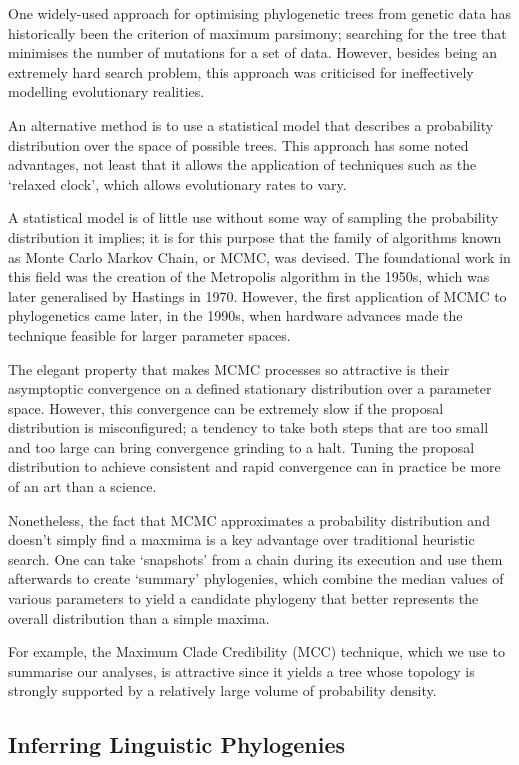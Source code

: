 \documentclass[10pt,journal,compsoc]{IEEEtran}
\begin{document}
One widely-used approach for optimising phylogenetic trees from genetic data has historically been the criterion of maximum parsimony; searching for the tree that minimises the number of mutations for a set of data. However, besides being an extremely hard search problem, this approach was criticised for ineffectively modelling evolutionary realities.

An alternative method is to use a statistical model that describes a probability distribution over the space of possible trees. This approach has some noted advantages, not least that it allows the application of techniques such as the `relaxed clock', which allows evolutionary rates to vary.

A statistical model is of little use without some way of sampling the probability distribution it implies; it is for this purpose that the family of algorithms known as Monte Carlo Markov Chain, or MCMC, was devised. The foundational work in this field was the creation of the Metropolis algorithm in the 1950s, which was later generalised by Hastings in 1970. However, the first application of MCMC to phylogenetics came later, in the 1990s, when hardware advances made the technique feasible for larger parameter spaces.

The elegant property that makes MCMC processes so attractive is their asymptoptic convergence on a defined stationary distribution over a parameter space. However, this convergence can be extremely slow if the proposal distribution is misconfigured; a tendency to take both steps that are too small and too large can bring convergence grinding to a halt. Tuning the proposal distribution to achieve consistent and rapid convergence can in practice be more of an art than a science.

Nonetheless, the fact that MCMC approximates a probability distribution and doesn't simply find a maxmima is a key advantage over traditional heuristic search. One can take `snapshots' from a chain during its execution and use them afterwards to create `summary' phylogenies, which combine the median values of various parameters to yield a candidate phylogeny that better represents the overall distribution than a simple maxima.

For example, the Maximum Clade Credibility (MCC) technique, which we use to summarise our analyses, is attractive since it yields a tree whose topology is strongly supported by a relatively large volume of probability density.

\subsection{Inferring Linguistic Phylogenies}
\end{document}
